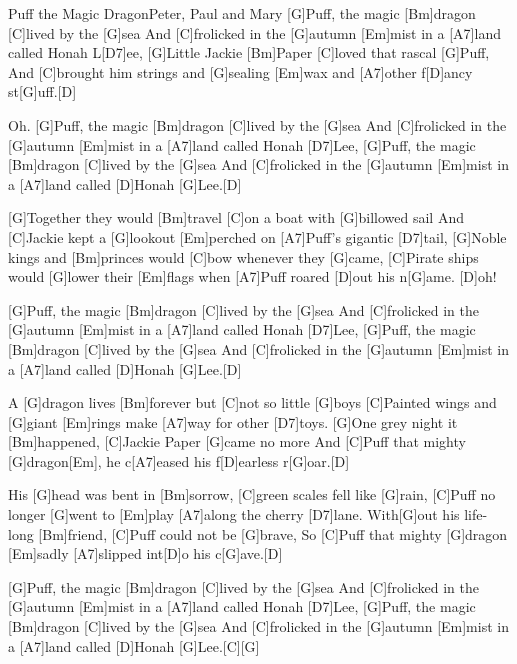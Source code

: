 \documentclass[../main.tex]{subfiles}
\begin{document}
\begin{song}{Puff the Magic Dragon}{Peter, Paul and Mary}{}
[G]Puff, the magic [Bm]dragon [C]lived by the [G]sea
And [C]frolicked in the [G]autumn [Em]mist in a [A7]land called Honah L[D7]ee,
[G]Little Jackie [Bm]Paper [C]loved that rascal [G]Puff,
And [C]brought him strings and [G]sealing [Em]wax and [A7]other f[D]ancy st[G]uff.[D]{\hh}

Oh. [G]Puff, the magic [Bm]dragon [C]lived by the [G]sea
And [C]frolicked in the [G]autumn [Em]mist in a [A7]land called Honah [D7]Lee,
[G]Puff, the magic [Bm]dragon [C]lived by the [G]sea
And [C]frolicked in the [G]autumn [Em]mist in a [A7]land called [D]Honah [G]Lee.[D]{\hh}

[G]Together they would [Bm]travel [C]on a boat with [G]billowed sail
And [C]Jackie kept a [G]lookout [Em]perched on [A7]Puff’s gigantic [D7]tail,
[G]Noble kings and [Bm]princes would [C]bow whenever they [G]came,
[C]Pirate ships would [G]lower their [Em]flags when [A7]Puff roared [D]out his n[G]ame. [D]oh!

[G]Puff, the magic [Bm]dragon [C]lived by the [G]sea
And [C]frolicked in the [G]autumn [Em]mist in a [A7]land called Honah [D7]Lee,
[G]Puff, the magic [Bm]dragon [C]lived by the [G]sea
And [C]frolicked in the [G]autumn [Em]mist in a [A7]land called [D]Honah [G]Lee.[D]{\hh}

A [G]dragon lives [Bm]forever but [C]not so little [G]boys
[C]Painted wings and [G]giant [Em]rings make [A7]way for other [D7]toys.
[G]One grey night it [Bm]happened, [C]Jackie Paper [G]came no more
And [C]Puff that mighty [G]dragon[Em], he c[A7]eased his f[D]earless r[G]oar.[D]{\hh}

His [G]head was bent in [Bm]sorrow, [C]green scales fell like [G]rain,
[C]Puff no longer [G]went to [Em]play [A7]along the cherry [D7]lane.
With[G]out his life-long [Bm]friend, [C]Puff could not be [G]brave,
So [C]Puff that mighty [G]dragon [Em]sadly [A7]slipped int[D]o his c[G]ave.[D]{\hh}

[G]Puff, the magic [Bm]dragon [C]lived by the [G]sea
And [C]frolicked in the [G]autumn [Em]mist in a [A7]land called Honah [D7]Lee,
[G]Puff, the magic [Bm]dragon [C]lived by the [G]sea
And [C]frolicked in the [G]autumn [Em]mist in a [A7]land called [D]Honah [G]Lee.[C]{\hh}[G]{\hh}
\end{song}
\end{document}
